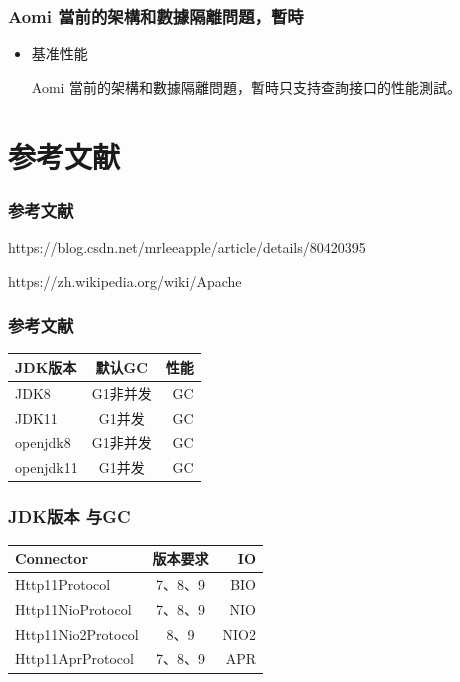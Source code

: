\documentclass{beamer}
\begin{document}
\begin{frame}
\frametitle{Aomi 當前的架構和數據隔離問題，暫時}
\begin{itemize}
	\item 基准性能
	\small
	
	
	Aomi 當前的架構和數據隔離問題，暫時只支持查詢接口的性能測試。
	
	
	
	
\end{itemize}
\end{frame}



\section{参考文献}

\begin{frame}[allowframebreaks]
\frametitle{参考文献}
\small


https://blog.csdn.net/mrleeapple/article/details/80420395

https://zh.wikipedia.org/wiki/Apache%
\end{frame}

\begin{frame}[allowframebreaks]
\frametitle{参考文献}
\centering
\begin{tabular}{|l|c|r|}
\hline 
\large	JDK版本 &  \large 默认GC&  \large 性能 \\
\hline 
JDK8 & G1非并发 &  GC \\
\hline 
JDK11 & G1并发 & GC \\
\hline 
openjdk8 & G1非并发& GC  \\
\hline 
openjdk11& G1并发 & GC \\
\hline
\end{tabular}
\end{frame}

\begin{frame}[allowframebreaks]
\frametitle{JDK版本 与GC}
\centering
\begin{tabular}{|l|c|r|}
\hline 
\large	Connector&  \large 版本要求&  \large IO \\
\hline 
Http11Protocol & 7、8、9 & BIO \\
\hline 
Http11NioProtocol & 7、8、9 & NIO \\
\hline 
Http11Nio2Protocol & 8、9& NIO2  \\
\hline 
Http11AprProtocol& 7、8、9 & APR \\
\hline
\end{tabular}
\end{frame}
\end{document}
